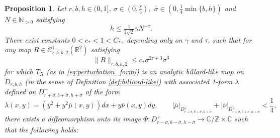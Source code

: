 \documentclass[10pt,a4paper]{amsart}
\newtheorem{proposition}{Proposition}
\newcommand{\C}{\mathbb{C}}
\newcommand{\Domain}[3]{D_{#1, #2, #3}}
\newcommand{\DomainP}[3]{D_{#1, #2, #3}^+}
\newcommand{\N}{\mathbb{N}}
\newcommand{\R}{\mathbb{R}}
\newcommand{\Z}{\mathbb{Z}}
\begin{document}
\begin{proposition}
\label{prop:estimates_one_step}
 Let $r,b,h\in(0,1]$, $\sigma \in (0, \tfrac{r}{4}),$ $\overline{\sigma} \in (0, \tfrac{1}{4}\min\{b, h\})$ and $N \in \N_{> 0}$ satisfying
 \begin{equation}
 \label{eq:relation_N_h}
 h \leq \tfrac{1}{2\sqrt 2}\gamma N^{-\tau}.
 \end{equation}
 There exist constants $0 < c_{\ast}< 1 < C_\ast ,$  depending only on $\gamma$ and $\tau$, such that for any map $R\in\mathscr C^1_{r,b,h, 2}(\R^2)$ satisfying
 \begin{equation}
 \label{equation:assumption_R}
 \|R\|_{r,b,h,2}\leq c_\ast
\sigma^{2\tau+3}\overline\sigma^3
 \end{equation}
 for which $T_R$ %
 (as in \eqref{eq:perturbation_form}) is an analytic billard-like map on $\Domain{r}{b}{h}$ (in the sense of Definition \ref{def:billiard-like}) with associated 1-form $\lambda$ defined on $\DomainP{r + \overline \sigma}{b + \overline \sigma}{h + \overline \sigma}$ of the form
\[\lambda(x, y) = (y^2 + y^2\overline \mu(x, y))dx + y \overline \nu(x, y)dy, %
\qquad |\overline \mu|_{\DomainP{r + \overline \sigma}{b + \overline \sigma}{h + \overline \sigma}} + |\overline \nu|_{\DomainP{r + \overline \sigma}{b + \overline \sigma}{h + \overline \sigma}} < \frac{1}{4},\]
there exists a diffeomorphism onto its image $\Phi: \DomainP{r - \sigma}{b - \overline \sigma}{h - \overline \sigma} \to \C/\Z \times \C$ such that the following holds:


\end{proposition}
\end{document}
